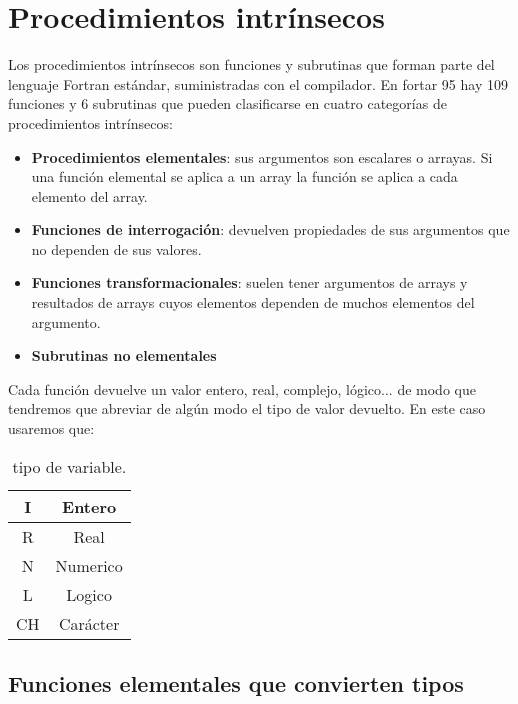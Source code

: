 \section{Procedimientos intrínsecos}

Los procedimientos intrínsecos son funciones y subrutinas que forman parte del lenguaje Fortran estándar, suministradas con el compilador. En fortar 95 hay 109 funciones y 6 subrutinas que pueden clasificarse en cuatro categorías de procedimientos intrínsecos:

\begin{itemize}
	\item \textbf{Procedimientos elementales}: sus argumentos son escalares o arrayas. Si una función elemental se aplica a un array la función se aplica a cada elemento del array.
	\item \textbf{Funciones de interrogación}: devuelven propiedades de sus argumentos que no dependen de sus valores.
	\item \textbf{Funciones transformacionales}: suelen tener argumentos de arrays y resultados de arrays cuyos elementos dependen de muchos elementos del argumento.
	\item \textbf{Subrutinas no elementales}
\end{itemize}

Cada función devuelve un valor entero, real, complejo, lógico... de modo que tendremos que abreviar de algún modo el tipo de valor devuelto. En este caso usaremos que:


\begin{table}[h!] \centering
	\begin{tabular}{|c|c|}
		\hline 
		I & Entero \\ 
		\hline 
		R & Real \\
		\hline 
		N & Numerico  \\
		\hline 
		L & Logico \\
		\hline 
		CH & Carácter\\
		\hline 
	\end{tabular}
	\caption{tipo de variable.}
	\label{Tab:01-02}
\end{table}

\subsection{Funciones elementales que convierten tipos}

